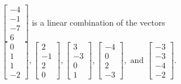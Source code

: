 \begin{exerciseAnswer}
\begin{enumerate}[(a)]
\( \left[\begin{array}{c}
-4 \\
-1 \\
-7 \\
6
\end{array}\right] \) is a linear combination of the vectors \( \left[\begin{array}{c}
0 \\
1 \\
1 \\
-2
\end{array}\right] , \left[\begin{array}{c}
2 \\
-1 \\
2 \\
0
\end{array}\right] , \left[\begin{array}{c}
3 \\
-3 \\
0 \\
1
\end{array}\right] , \left[\begin{array}{c}
-4 \\
0 \\
2 \\
-3
\end{array}\right] , \text{ and } \left[\begin{array}{c}
-3 \\
-3 \\
-4 \\
-2
\end{array}\right] \). 


\end{enumerate}
    
\end{exerciseAnswer}
    
